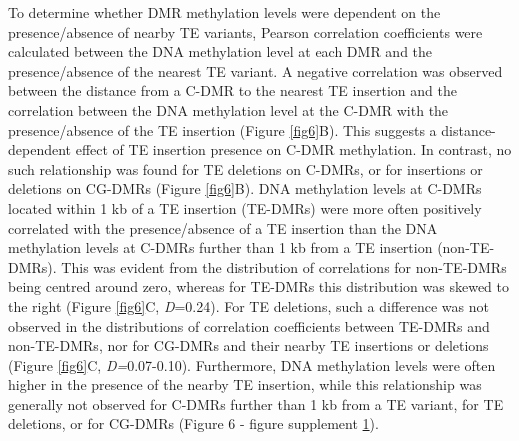 \documentclass[12pt]{article}
\begin{document}
To determine whether DMR methylation levels were dependent on the
presence/absence of nearby TE variants, Pearson correlation coefficients
were calculated between the DNA methylation level at each DMR and the
presence/absence of the nearest TE variant. A negative correlation was
observed between the distance from a C-DMR to the nearest TE insertion
and the correlation between the DNA methylation level at the C-DMR with
the presence/absence of the TE insertion (Figure \ref{fig6}B). This suggests a
distance-dependent effect of TE insertion presence on C-DMR methylation.
In contrast, no such relationship was found for TE deletions on C-DMRs,
or for insertions or deletions on CG-DMRs (Figure \ref{fig6}B). DNA methylation
levels at C-DMRs located within 1 kb of a TE insertion (TE-DMRs) were
more often positively correlated with the presence/absence of a TE
insertion than the DNA methylation levels at C-DMRs further than 1 kb
from a TE insertion (non-TE-DMRs). This was evident from the
distribution of correlations for non-TE-DMRs being centred around zero,
whereas for TE-DMRs this distribution was skewed to the right (Figure
\ref{fig6}C, \emph{D}=0.24). For TE deletions, such a difference was not observed
in the distributions of correlation coefficients between TE-DMRs and
non-TE-DMRs, nor for CG-DMRs and their nearby TE insertions or deletions
(Figure \ref{fig6}C, \emph{D=}0.07-0.10). Furthermore, DNA methylation levels
were often higher in the presence of the nearby TE insertion, while this
relationship was generally not observed for C-DMRs further than 1 kb
from a TE variant, for TE deletions, or for CG-DMRs (Figure 6 - figure
supplement \hyperref[fig6s1]{1}).
\end{document}
